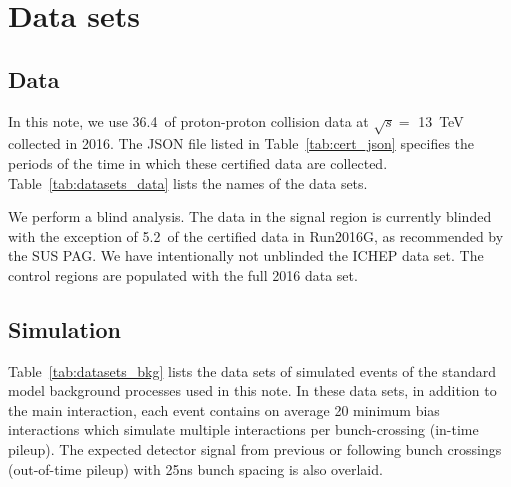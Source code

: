 \section{Data sets}
\label{sec:datasets}

\subsection{Data}


In this note, we use 36.4~\ifb of proton-proton collision data at
$\sqrt{s} =$ 13~TeV collected in 2016. The JSON file listed in
Table~\ref{tab:cert_json} specifies the periods of the time in which
these certified data are collected. Table~\ref{tab:datasets_data} lists
the names of the data sets.

We perform a blind analysis. The data in the signal region is
currently blinded with the exception of 5.2~\ifb of the certified data
in Run2016G, as recommended by the SUS PAG. We have intentionally not
unblinded the ICHEP data set. The control regions are populated with
the full 2016 data set.

\begin{table}[!h]
  \footnotesize
   
  \label{tab:cert_json}
\end{table}

\begin{table}[!h]
  \footnotesize 
  \label{tab:datasets_data}
\end{table}


\subsection{Simulation}

Table~\ref{tab:datasets_bkg} lists the data sets of simulated events
of the standard model background processes used in this note. In these
data sets, in addition to the main interaction, each event contains on
average 20 minimum bias interactions which simulate multiple
interactions per bunch-crossing (in-time pileup). The expected
detector signal from previous or following bunch crossings
(out-of-time pileup) with 25ns bunch spacing is also overlaid.

